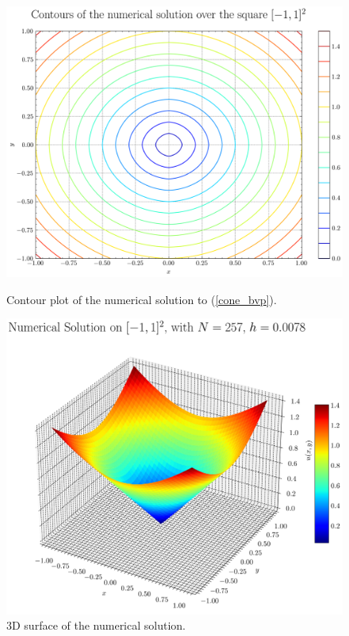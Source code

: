 \documentclass[11pt]{article}
\theoremstyle{definition}
\theoremstyle{remark}
\begin{document}
\begin{figure}[h!]
    \centering
    \begin{minipage}{0.48\linewidth}
        \centering
        \includegraphics[width=\linewidth]{plots/contour_plot_2D_distance.png}
        \caption{Contour plot of the numerical solution to (\ref{cone_bvp}).}
        \label{fig:contour-distance}
    \end{minipage}
    \hfill
    \begin{minipage}{0.48\linewidth}
        \centering
        \includegraphics[width=\linewidth]{plots/solution_3d_surface.png}
        \caption{3D surface of the numerical solution.}
        \label{fig:3d-surface}
    \end{minipage}
\end{figure}
\end{document}
